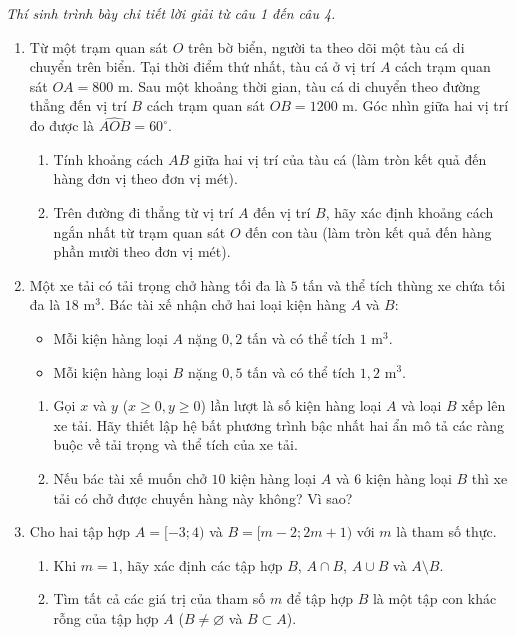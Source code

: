 \documentclass[12pt,a4paper]{article}
\newcommand{\parttitle}[1]{\par\vspace{1.5pt}\needspace{2\baselineskip}{\large\bfseries\color{ink}#1}\par\nopagebreak\vspace{1pt}}
\begin{document}
\parttitle{PHẦN IV. Tự luận}
\textit{Thí sinh trình bày chi tiết lời giải từ câu 1 đến câu 4.}
\begin{enumerate}
\item Từ một trạm quan sát $O$ trên bờ biển, người ta theo dõi một tàu cá di chuyển trên biển. Tại thời điểm thứ nhất, tàu cá ở vị trí $A$ cách trạm quan sát $OA = 800\text{ m}$. Sau một khoảng thời gian, tàu cá di chuyển theo đường thẳng đến vị trí $B$ cách trạm quan sát $OB = 1200\text{ m}$. Góc nhìn giữa hai vị trí đo được là $\widehat{AOB} = 60^\circ$.
\begin{enumerate}
    \item Tính khoảng cách $AB$ giữa hai vị trí của tàu cá (làm tròn kết quả đến hàng đơn vị theo đơn vị mét).
    \item Trên đường đi thẳng từ vị trí $A$ đến vị trí $B$, hãy xác định khoảng cách ngắn nhất từ trạm quan sát $O$ đến con tàu (làm tròn kết quả đến hàng phần mười theo đơn vị mét).
\end{enumerate}

\item Một xe tải có tải trọng chở hàng tối đa là $5$ tấn và thể tích thùng xe chứa tối đa là $18\text{ m}^3$. Bác tài xế nhận chở hai loại kiện hàng $A$ và $B$:
\begin{itemize}[leftmargin=1.5em, itemsep=0.1pt]
    \item Mỗi kiện hàng loại $A$ nặng $0{,}2$ tấn và có thể tích $1\text{ m}^3$.
    \item Mỗi kiện hàng loại $B$ nặng $0{,}5$ tấn và có thể tích $1{,}2\text{ m}^3$.
\end{itemize}
\begin{enumerate}
    \item Gọi $x$ và $y$ ($x \ge 0, y \ge 0$) lần lượt là số kiện hàng loại $A$ và loại $B$ xếp lên xe tải. Hãy thiết lập hệ bất phương trình bậc nhất hai ẩn mô tả các ràng buộc về tải trọng và thể tích của xe tải.
    \item Nếu bác tài xế muốn chở $10$ kiện hàng loại $A$ và $6$ kiện hàng loại $B$ thì xe tải có chở được chuyến hàng này không? Vì sao?
\end{enumerate}

\item Cho hai tập hợp $A = [-3; 4)$ và $B = [m - 2; 2m + 1)$ với $m$ là tham số thực.
\begin{enumerate}
    \item Khi $m = 1$, hãy xác định các tập hợp $B$, $A \cap B$, $A \cup B$ và $A \setminus B$.
    \item Tìm tất cả các giá trị của tham số $m$ để tập hợp $B$ là một tập con khác rỗng của tập hợp $A$ ($B \ne \varnothing$ và $B \subset A$).
\end{enumerate}


\end{enumerate}
\end{document}
